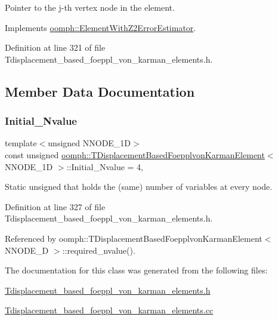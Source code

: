 Pointer to the j-\/th vertex node in the element. 



Implements \hyperlink{classoomph_1_1ElementWithZ2ErrorEstimator_a0eedccc33519f852c5dc2055ddf2774b}{oomph\+::\+Element\+With\+Z2\+Error\+Estimator}.



Definition at line 321 of file Tdisplacement\+\_\+based\+\_\+foeppl\+\_\+von\+\_\+karman\+\_\+elements.\+h.



\subsection{Member Data Documentation}
\mbox{\label{classoomph_1_1TDisplacementBasedFoepplvonKarmanElement_a2bec0ef510b12d4e1ad23e3e8d966306}} 
\subsubsection{\texorpdfstring{Initial\+\_\+\+Nvalue}{Initial\_Nvalue}}
{\footnotesize\ttfamily template$<$unsigned N\+N\+O\+D\+E\+\_\+1D$>$ \\
const unsigned \hyperlink{classoomph_1_1TDisplacementBasedFoepplvonKarmanElement}{oomph\+::\+T\+Displacement\+Based\+Foepplvon\+Karman\+Element}$<$ N\+N\+O\+D\+E\+\_\+1D $>$\+::Initial\+\_\+\+Nvalue = 4\hspace{0.3cm}{\ttfamily [static]}, {\ttfamily [private]}}



Static unsigned that holds the (same) number of variables at every node. 



Definition at line 327 of file Tdisplacement\+\_\+based\+\_\+foeppl\+\_\+von\+\_\+karman\+\_\+elements.\+h.



Referenced by oomph\+::\+T\+Displacement\+Based\+Foepplvon\+Karman\+Element$<$ N\+N\+O\+D\+E\+\_\+D $>$\+::required\+\_\+nvalue().



The documentation for this class was generated from the following files\+:\begin{DoxyCompactItemize}
\item 
\hyperlink{Tdisplacement__based__foeppl__von__karman__elements_8h}{Tdisplacement\+\_\+based\+\_\+foeppl\+\_\+von\+\_\+karman\+\_\+elements.\+h}\item 
\hyperlink{Tdisplacement__based__foeppl__von__karman__elements_8cc}{Tdisplacement\+\_\+based\+\_\+foeppl\+\_\+von\+\_\+karman\+\_\+elements.\+cc}\end{DoxyCompactItemize}
